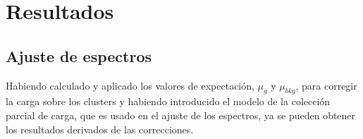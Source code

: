 \chapter{Resultados \label{chap:Resultados}}
\section{Ajuste de espectros}
\noindent Habiendo calculado y aplicado los valores de expectación, $\mu_{g}$ y $\mu_{bkg}$, para corregir la carga sobre los clusters y habiendo introducido el modelo de la colección parcial de carga, que es usado en el ajuste de los espectros, ya se pueden obtener los resultados derivados de las correcciones.

